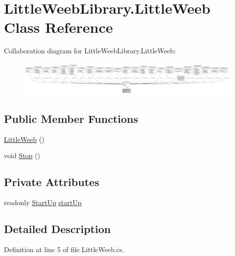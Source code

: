 \hypertarget{class_little_weeb_library_1_1_little_weeb}{}\section{Little\+Weeb\+Library.\+Little\+Weeb Class Reference}
\label{class_little_weeb_library_1_1_little_weeb}


Collaboration diagram for Little\+Weeb\+Library.\+Little\+Weeb\+:\nopagebreak
\begin{figure}[H]
\begin{center}
\leavevmode
\includegraphics[width=350pt]{class_little_weeb_library_1_1_little_weeb__coll__graph}
\end{center}
\end{figure}
\subsection*{Public Member Functions}
\begin{DoxyCompactItemize}
\item 
\mbox{\hyperlink{class_little_weeb_library_1_1_little_weeb_a15e3c466b1eccd90f03c3d2661dfbfd7}{Little\+Weeb}} ()
\item 
void \mbox{\hyperlink{class_little_weeb_library_1_1_little_weeb_abdb53c29265dddd9fa0a27c8bf4d50f2}{Stop}} ()
\end{DoxyCompactItemize}
\subsection*{Private Attributes}
\begin{DoxyCompactItemize}
\item 
readonly \mbox{\hyperlink{class_little_weeb_library_1_1_start_up}{Start\+Up}} \mbox{\hyperlink{class_little_weeb_library_1_1_little_weeb_ad4c016487a2b4f445d12bd8dc0414675}{start\+Up}}
\end{DoxyCompactItemize}


\subsection{Detailed Description}


Definition at line 5 of file Little\+Weeb.\+cs.



